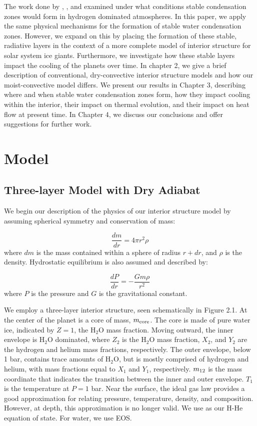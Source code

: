 \documentclass[11pt]{ucscthesisbs}
\begin{document}
The work done by \citep{guillot_1995}, \citep{friedson_2017}, and \citep{leconte_2017} examined under what conditions stable condensation zones would form in hydrogen dominated atmospheres. In this paper, we apply the same physical mechanisms for the formation of stable water condensation zones. However, we expand on this by placing the formation of these stable, radiative layers in the context of a more complete model of interior structure for solar system ice giants. Furthermore, we investigate how these stable layers impact the cooling of the planets over time. In chapter 2, we give a brief description of conventional, dry-convective interior structure models and how our moist-convective model differs. We present our results in Chapter 3, describing where and when stable water condensation zones form, how they impact cooling within the interior, their impact on thermal evolution, and their impact on heat flow at present time. In Chapter 4, we discuss our conclusions and offer suggestions for further work.


\chapter{Model}

\section{Three-layer Model with Dry Adiabat}
\label{Three-layer Model with Dry Adiabat}
We begin our description of the physics of our interior structure model by assuming spherical symmetry and conservation of mass:

\begin{equation}
  \frac{dm}{dr} =4 \pi r^{2}\rho  
\end{equation}
where $dm$ is the mass contained within a sphere of radius $r + dr$, and $\rho$ is the density. Hydrostatic equilibrium is also assumed and described by:

\begin{equation}
  \frac{dP}{dr} = -\frac{Gm\rho}{r^{2}}  
\end{equation}
where $P$ is the pressure and $G$ is the gravitational constant. 

We employ a three-layer interior structure, seen schematically in Figure 2.1. At the center of the planet is a core of mass, $m_{\rm core}$. The core is made of pure water ice, indicated by $Z = 1$, the H$_{2}$O mass fraction. Moving outward, the inner envelope is H$_{2}$O dominated, where $Z_{2}$ is the H$_{2}$O mass fraction, $X_{2}$, and $Y_{2}$ are the hydrogen and helium mass fractions, respectively. The outer envelope, below 1 bar, contains trace amounts of H$_{2}$O, but is mostly comprised of hydrogen and helium, with mass fractions equal to $X_{1}$ and $Y_{1}$, respectively. $m_{\rm 12}$ is the mass coordinate that indicates the transition between the inner and outer envelope. $T_{1}$ is the temperature at $P=1$ bar. Near the surface, the ideal gas law provides a good approximation for relating pressure, temperature, density, and composition. However, at depth, this approximation is no longer valid. We use \citep{chabrier_eos} as our H-He equation of state. For water, we use \citep{mazevet_2019} EOS. 
\end{document}
